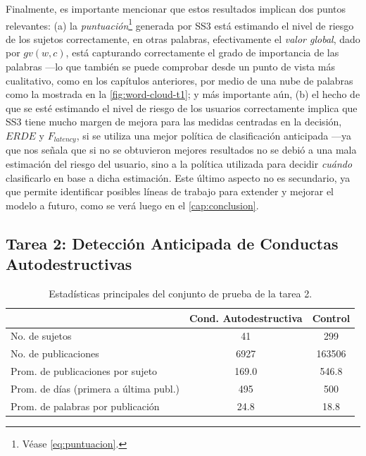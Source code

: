 \begin{itemize}
    Finalmente, es importante mencionar que estos resultados implican dos puntos relevantes: (a) la \emph{puntuación}\footnote{Véase \autoref{eq:puntuacion}.} generada por SS3 está estimando el nivel de riesgo de los sujetos correctamente, en otras palabras, efectivamente el \emph{valor global}, dado por $gv(w, c)$, está capturando correctamente el grado de importancia de las palabras ---lo que también se puede comprobar desde un punto de vista más cualitativo, como en los capítulos anteriores, por medio de una nube de palabras como la mostrada en la \autoref{fig:word-cloud-t1}; y más importante aún, (b) el hecho de que se esté estimando el nivel de riesgo de los usuarios correctamente implica que SS3 tiene mucho margen de mejora para las medidas centradas en la decisión, $ERDE$ y $F_{latency}$, si se utiliza una mejor política de clasificación anticipada ---ya que nos señala que si no se obtuvieron mejores resultados no se debió a una mala estimación del riesgo del usuario, sino a la política utilizada para decidir \emph{cuándo} clasificarlo en base a dicha estimación.
    Este último aspecto no es secundario, ya que permite identificar posibles líneas de trabajo para extender y mejorar el modelo a futuro, como se verá luego en el \autoref{cap:conclusion}.
\end{itemize}


\subsection{Tarea 2: Detección Anticipada de Conductas Autodestructivas}%



\begin{table}[t]
\centering
\caption{Estadísticas principales del conjunto de prueba de la tarea 2.}
\label{tab:dataset-t2}
\begin{tabular}{l c c}
\hline
& Cond. Autodestructiva & Control \\ \hline
No. de sujetos & 41 & 299 \\
No. de publicaciones & 6927 & 163506 \\
Prom. de publicaciones por sujeto & 169.0 & 546.8 \\
Prom. de días (primera a última publ.) & 495 & 500 \\
Prom. de palabras por publicación & 24.8 & 18.8 \\ \hline

\hline
\end{tabular}
\end{table}



